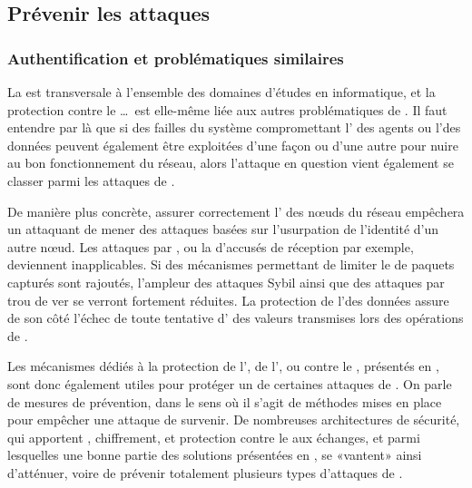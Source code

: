 \subsection{Prévenir les attaques}

    \subsubsection{Authentification et problématiques similaires}
La \secu est transversale à l'ensemble des domaines d'études en informatique, et la protection contre le \dds\dots\ est elle-même liée aux autres problématiques de \secu.
Il faut entendre par là que si des failles du système compromettant l' des agents ou l'\integrite des données peuvent également être exploitées d'une façon ou d'une autre pour nuire au bon fonctionnement du réseau, alors l'attaque en question vient également se classer parmi les attaques de \dds.

De manière plus concrète, assurer correctement l' des nœuds du réseau empêchera un attaquant de mener des attaques basées sur l'usurpation de l'identité d'un autre nœud.
Les attaques par \desync, ou la  d'accusés de réception par exemple, deviennent inapplicables.
Si des mécanismes permettant de limiter le  de paquets capturés sont rajoutés, l'ampleur des attaques Sybil ainsi que des attaques par trou de ver se verront fortement réduites.
La protection de l'\integrite des données assure de son côté l'échec de toute tentative d' des valeurs transmises lors des opérations de .

Les mécanismes dédiés à la protection de l', de l'\integrite, ou contre le , présentés en , sont donc également utiles pour protéger un \rc de certaines attaques de \dds.
On parle de mesures de prévention, dans le sens où il s'agit de méthodes mises en place pour empêcher une attaque de survenir.
De nombreuses architectures de sécurité, qui apportent , chiffrement, \integrite et protection contre le  aux échanges, et parmi lesquelles une bonne partie des solutions présentées en , se «vantent» ainsi d'atténuer, voire de prévenir totalement plusieurs types d'attaques de \dds.

